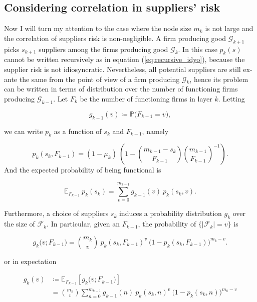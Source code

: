 \documentclass[american, abstract=on]{scrartcl}
\newcommand{\F}{\mathcal{F}}
\newcommand{\G}{\mathcal{G}}
\renewcommand{\P}{\mathbb{P}}
\newcommand{\E}{\mathbb{E}}
\newcommand{\abs}[1]{\left\lvert#1\right\rvert}
\begin{document}
\subsection{Considering correlation in suppliers' risk} \label{sec:vertical:considering}

Now I will turn my attention to the case where the node size $m_k$ is not large and the correlation of suppliers risk is non-negligible. A firm producing good $\G_{k + 1}$ picks $s_{k + 1}$ suppliers among the firms producing good $\G_k$. In this case $p_k(s)$ cannot be written recursively as in equation (\ref{eq:recursive_idyo}), because the supplier risk is not idiosyncratic. Nevertheless, all potential suppliers are still ex-ante the same from the point of view of a firm producing $\G_k$, hence its problem can be written in terms of distribution over the number of functioning firms producing $\G_{k-1}$. Let $F_k$ be the number of functioning firms in layer $k$. Letting

\begin{equation}
  g_{k-1}(v) \coloneqq \P\Big( F_{k - 1} = v \Big),
\end{equation}

we can write $p_k$ as a function of $s_k$ and $F_{k-1}$, namely

\begin{equation}
  p_k\left(s_k, F_{k-1} \right) = (1 - \mu_k) \ \left(1 - \binom{m_{k-1} - s_k}{F_{k-1}} \binom{m_{k-1}}{F_{k-1}}^{-1} \right).
\end{equation}
And the expected probability of being functional is

\begin{equation}
  \E_{F_{k-1}} \  p_k(s_k) = \sum^{m_{k-1}}_{v = 0} g_{k-1}(v) \  p_k(s_k, v).
\end{equation}

Furthermore, a choice of suppliers $s_k$ induces a probability distribution $g_k$ over the size of $\F_k$. In particular, given an $F_{k-1}$, the probability of $\{ \abs{\F_{k}} = v \}$ is 

\begin{equation}
  g_k\Big(v; F_{k-1}\Big) = \binom{m_k}{v} \ p_k(s_k, F_{k-1})^{v} \ \Big(1 - p_k(s_k, F_{k-1})\Big)^{m_k - v}.
\end{equation}

or in expectation

\begin{equation}
  \begin{split}
    g_k(v) &\coloneqq \E_{F_{k-1}} \left[ g_k\Big(v; F_{k-1}\Big)\right] \\
    &= \binom{m_k}{v} \sum^{m_{k-1}}_{n = 0} g_{k-1}(n) \ p_{k}(s_k, n)^{v} \ \Big(1 - p_{k}(s_k, n)\Big)^{m_k - v}
  \end{split}
\end{equation}
\end{document}
